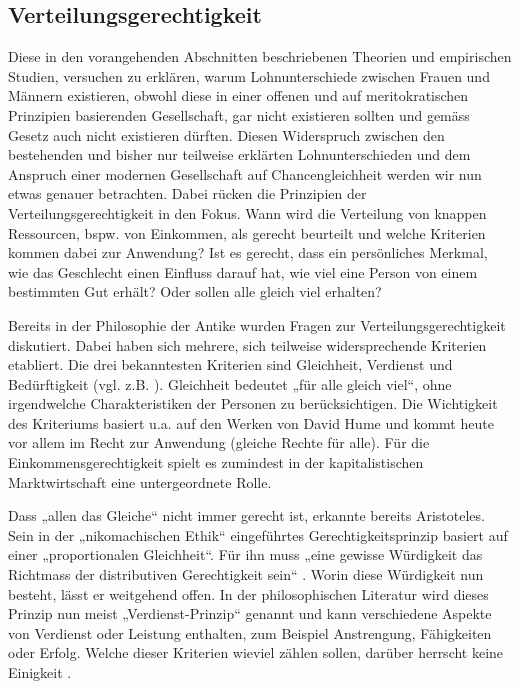 \documentclass[a4paper,12pt]{article}
\renewcommand{\baselinestretch}{1.1}
\newif\ifcomments
\newcommand{\comment}[1]{%
    \ifcomments\marginpar{\renewcommand{\baselinestretch}{1}\tiny\hspace*{-1.1em}\colorbox{gray!20}%
    {\textcolor{red}{\parbox[t]{.9in}{\raggedright #1}}}}\fi}
\begin{document}
\subsection{Verteilungsgerechtigkeit} \comment{diesen Abschnitt auch kürzen (und schärfen)}

\comment{statistische D. hat viel mit Vorstellungen zu tun; ähnliche Hinweise
bei Literatur zur Abwertung von Frauenberufen; oder auch die Theorien zur
Spezialisierung aufgrund von Rollen}

Diese in den vorangehenden Abschnitten beschriebenen Theorien und empirischen
Studien, versuchen zu erklären, warum Lohnunterschiede zwischen Frauen und
Männern existieren, obwohl diese in einer offenen und auf meritokratischen
Prinzipien basierenden Gesellschaft, gar nicht existieren sollten und gemäss
Gesetz auch nicht existieren dürften. Diesen Widerspruch zwischen den
bestehenden und bisher nur teilweise erklärten Lohnunterschieden und dem
Anspruch einer modernen Gesellschaft auf Chancengleichheit werden wir nun etwas
genauer betrachten. Dabei rücken die Prinzipien der Verteilungsgerechtigkeit in
den Fokus. Wann wird die Verteilung von knappen Ressourcen, bspw. von
Einkommen, als gerecht beurteilt und welche Kriterien kommen dabei zur
Anwendung? Ist es gerecht, dass ein persönliches Merkmal, wie das Geschlecht
einen Einfluss darauf hat, wie viel eine Person von einem bestimmten Gut
erhält? Oder sollen alle gleich viel erhalten?

Bereits in der Philosophie der Antike wurden Fragen zur
Verteilungsgerechtigkeit diskutiert. Dabei haben sich mehrere, sich teilweise
widersprechende Kriterien etabliert. Die drei bekanntesten Kriterien sind
Gleichheit, Verdienst und Bedürftigkeit (vgl. z.B.
\citealp{Deutsch-1975,Miller-1992,Sabbagh-2001}). Gleichheit bedeutet „für alle
gleich viel“, ohne irgendwelche Charakteristiken der Personen zu
berücksichtigen. Die Wichtigkeit des Kriteriums basiert u.a. auf den Werken von
David Hume und kommt heute vor allem im Recht zur Anwendung (gleiche Rechte für
alle). Für die Einkommensgerechtigkeit spielt es zumindest in der
kapitalistischen Marktwirtschaft eine untergeordnete Rolle.

Dass „allen das Gleiche“ nicht immer gerecht ist, erkannte bereits Aristoteles.
Sein in der „nikomachischen Ethik“ eingeführtes Gerechtigkeitsprinzip basiert
auf einer „proportionalen Gleichheit“. Für ihn muss „eine gewisse Würdigkeit
das Richtmass der distributiven Gerechtigkeit sein“
\citep[107]{Aristoteles-1985}. Worin diese Würdigkeit nun besteht, lässt er
weitgehend offen. In der philosophischen Literatur wird dieses Prinzip nun
meist „Verdienst-Prinzip“ genannt und kann verschiedene Aspekte von Verdienst
oder Leistung enthalten, zum Beispiel Anstrengung, Fähigkeiten oder Erfolg.
Welche dieser Kriterien wieviel zählen sollen, darüber herrscht keine Einigkeit
\citep{Lamont-1994}.
\end{document}
